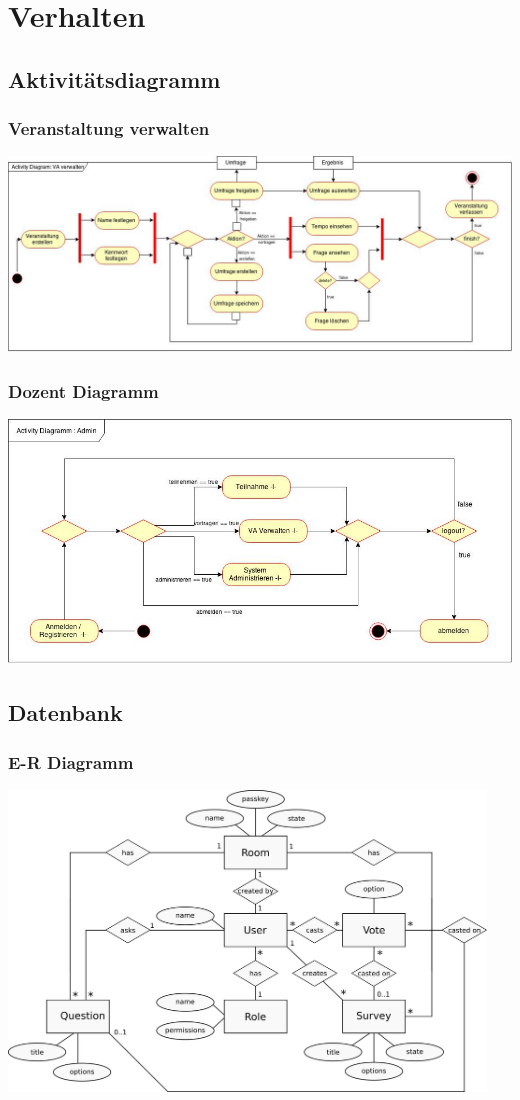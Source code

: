 \documentclass[german,a4paper]{beamer}
\begin{document}
\section{Verhalten}
\subsection{Aktivit\"{a}tsdiagramm}
\begin{frame}
\frametitle{Veranstaltung verwalten}
\includegraphics[width=1.0\textwidth]{./diagrams/activity/ad_SubVeranstaltungVerwalten.jpg}
\end{frame}

\begin{frame}
\frametitle{Dozent Diagramm}
\includegraphics[width=1.0\textwidth]{./diagrams/activity/AD_MainAdmin.jpg}
\end{frame}

\subsection{Datenbank}
\begin{frame}
\frametitle{E-R Diagramm}
\includegraphics[width=0.95\textwidth]{./diagrams/er/er_diagram.png}
\end{frame}
\end{document}
